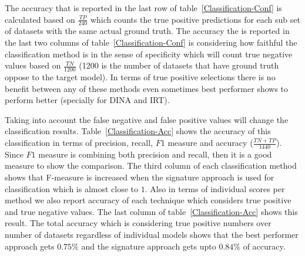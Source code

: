 The accuracy that is reported in the last row of table~\ref{Classification-Conf} is calculated based on $\frac{TP}{240}$ which counts the true positive predictions for each sub set of datasets with the same actual ground truth. The accuracy the is reported in the last two columns of table~\ref{Classification-Conf} is considering how faithful the classification method is in the sense of specificity which will count true negative values based on $\frac{TN}{1200}$ (1200 is the number of datasets that have ground truth oppose to the target model). In terms of true positive selections there is no benefit between any of these methods even sometimes best performer shows to perform better (specially for DINA and IRT).

Taking into account the false negative and false positive values will change the classification results. Table~\ref{Classification-Acc} shows the accuracy of this classification in terms of precision, recall, $F1$ measure and accuracy ($\frac{TN+TP}{1440}$). Since $F1$ measure is combining both precision and recall, then it is a good measure to show the comparison. The third column of each classification method shows that F-measure is increased when the signature approach is used for classification which is almost close to $1$. Also in terms of individual scores per method we also report accuracy of each technique which considers true positive and true negative values. The last column of table~\ref{Classification-Acc} shows this result. The total accuracy which is considering true positive numbers over number of datasets regardless of individual models shows that the best performer approach gets $0.75\%$ and the signature approach gets upto $0.84\%$ of accuracy.


